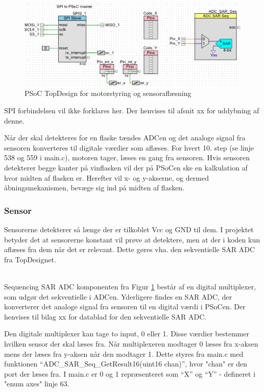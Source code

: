 \begin{figure}[H]
\includegraphics[scale=0.48]{Screenshots/PSoC_TopDesign_X_Y.png}
\caption{PSoC TopDesign for motorstyring og sensoraflæsning}
\label{PSoC_TopDesign_X_Y}
\end{figure}

SPI forbindelsen vil ikke forklares her. Der henvises til afsnit xx for uddybning af denne.

Når der skal detekteres for en flaske tændes ADCen og det analoge signal fra sensoren konverteres til digitale værdier som aflæses. For hvert 10. step (se linje 538 og 559 i main.c), motoren tager, læses en gang fra sensoren. Hvis sensoren detekterer begge kanter på vinflasken vil der på PSoCen ske en kalkulation af hvor midten af flasken er. Herefter vil x- og y-akserne, og dermed åbningsmekanismen, bevæge sig ind på midten af flasken.

\subsubsection{Sensor}
Sensorerne detekterer så længe der er tilkoblet Vcc og GND til dem. I projektet betyder det at sensorerne konstant vil prøve at detektere, men at der i koden kun aflæses fra dem når det er relevant. Dette gøres vha. den sekventielle SAR ADC fra TopDesignet.

 \\
Sequencing SAR ADC komponenten fra Figur \ref{PSoC_TopDesign_X_Y} består af en digital multiplexer, som udgør det sekventielle i ADCen. Yderligere findes en SAR ADC, der konverterer det analoge signal fra sensoren til en digital værdi i PSoCen. Der henvises til bilag xx for datablad for den sekventielle SAR ADC.

Den digitale multiplexer kan tage to input, 0 eller 1. Disse værdier bestemmer hvilken sensor der skal læses fra. Når multiplexeren modtager 0 læses fra x-aksen mens der læses fra y-aksen når den modtager 1. Dette styres fra main.c med funktionen ``ADC\_SAR\_Seq\_GetResult16(uint16 chan)'', hvor "chan" er den port der læses fra. I main.c er 0 og 1 repræsenteret som ``X'' og ``Y'' - defineret i "enum axes" linje 63.

